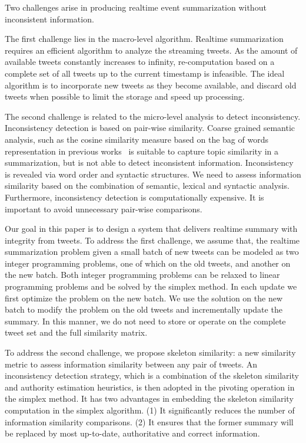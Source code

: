 \documentclass[envcountsame]{llncs}
\begin{document}
Two challenges arise in producing realtime event summarization without inconsistent information.

The first challenge lies in the macro-level algorithm. Realtime summarization requires an efficient algorithm to analyze the streaming tweets. As the amount of available tweets constantly increases to infinity, re-computation based on a complete set of all tweets up to the current timestamp is infeasible. The ideal algorithm is to  incorporate new tweets as they become available, and discard old tweets when possible to limit the storage and speed up processing.

The second challenge is related to the micro-level analysis to detect inconsistency. Inconsistency detection is based on pair-wise similarity. Coarse grained semantic analysis, such as the cosine similarity measure based on the bag of words representation in previous works~\cite{Takamura2011Summarizing,Lin2012Generating,Rudra2015Extracting,Shou2013Sumblr,Liu2016LEDS,Gillani2017Post,Zubiaga2012Towards,Sharifi2010Summarizing} is suitable to capture topic similarity in a summarization, but is not able to detect inconsistent information. Inconsistency is revealed via word order and syntactic structures. We need to assess information similarity based on the combination of semantic, lexical and syntactic analysis. Furthermore, inconsistency detection is computationally expensive. It is important to avoid unnecessary pair-wise comparisons.

Our goal in this paper is to design a system that delivers realtime summary with integrity from tweets. To address the first challenge, we assume that, the realtime summarization problem given a small batch of new tweets can be modeled as two integer programming problems, one of which on the old tweets, and another on the new batch. Both integer programming problems can be relaxed to linear programming problems and be solved by the simplex method. In each update we first optimize the problem on the new batch. We use the solution on the new batch to modify the problem on the old tweets and incrementally update the summary.  In this manner, we do not need to store or operate on the complete tweet set and the full similarity matrix.


To address the second challenge, we propose skeleton similarity: a new similarity metric to assess information similarity between any pair of tweets. An inconsistency detection strategy, which is a combination of the skeleton similarity and authority estimation heuristics, is then adopted in the pivoting operation in the simplex method. It has two advantages in embedding the skeleton similarity computation in the simplex algorithm. (1) It significantly reduces the number of information similarity comparisons. (2) It ensures that the former summary will be replaced by most up-to-date, authoritative and correct information.
\end{document}
